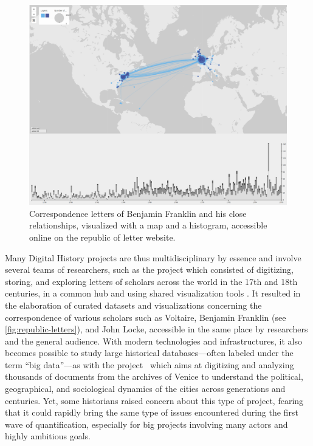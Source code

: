 \begin{figure}[!ht]
    \centering %
    \includegraphics[width=1\textwidth]{static/figures/RelatedWork/RepublicOfLetter_BenjFranklin}
    \caption{Correspondence letters of Benjamin Franklin and his close relationships, visualized with a map and a histogram, accessible online on the republic of letter website\cite{edelsteinHistoricalResearchDigital2017}.}
    \label{fig:republic-letters}
\end{figure}
Many Digital History projects are thus multidisciplinary by essence and involve several teams of researchers, such as the  project which consisted of digitizing, storing, and exploring letters of scholars across the world in the 17th and 18th centuries, in a common hub and using shared visualization tools \cite{edelsteinHistoricalResearchDigital2017}.
It resulted in the elaboration of curated datasets and visualizations concerning the correspondence of various scholars such as Voltaire, Benjamin Franklin (see \autoref{fig:republic-letters}), and John Locke, accessible in the same place by researchers and the general audience.
With modern technologies and infrastructures, it also becomes possible to study large historical databases---often labeled under the term ``big data''---as with the  project~\cite{kaplanVeniceTimeMachine2015} which aims at digitizing and analyzing thousands of documents from the archives of Venice to understand the political, geographical, and sociological dynamics of the cities across generations and centuries.
Yet, some historians raised concern about this type of project, fearing that it could rapidly bring the same type of issues encountered during the first wave of quantification, especially for big projects involving many actors and highly ambitious goals\cite{lemercierQuantitativeMethodsHumanities2019}.

